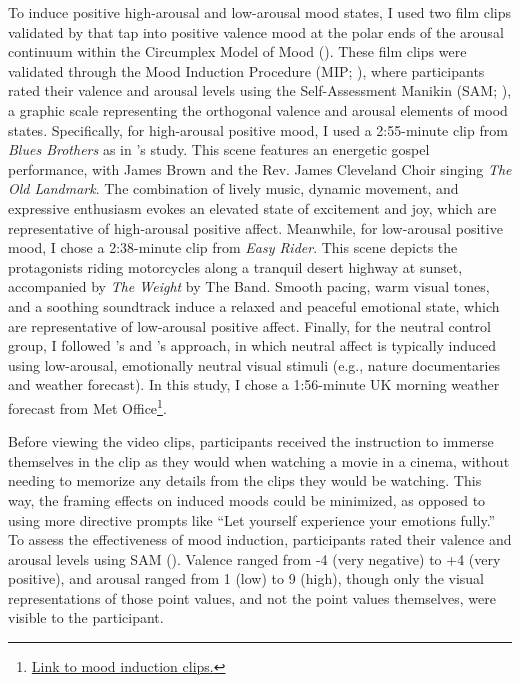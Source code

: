 \documentclass[../MA_Thesis.tex]{subfiles}
\begin{document}
To induce positive high-arousal and low-arousal mood states, I used two film clips validated by \textcite{wensveen_push_2002} that tap into positive valence mood at the polar ends of the arousal continuum within the Circumplex Model of Mood (\cite{feldman_variations_1995}). These film clips were validated through the Mood Induction Procedure (MIP; \cite{lench_discrete_2011}), where participants rated their valence and arousal levels using the Self-Assessment Manikin (SAM; \cite{bradley_affect_1999}), a graphic scale representing the orthogonal valence and arousal elements of mood states. Specifically, for high-arousal positive mood, I used a 2:55-minute clip from \textit{Blues Brothers} as in \cite{wensveen_push_2002}'s study. This scene features an energetic gospel performance, with James Brown and the Rev. James Cleveland Choir singing \textit{The Old Landmark}. The combination of lively music, dynamic movement, and expressive enthusiasm evokes an elevated state of excitement and joy, which are representative of high-arousal positive affect. Meanwhile, for low-arousal positive mood, I chose a 2:38-minute clip from \textit{Easy Rider}. This scene depicts the protagonists riding motorcycles along a tranquil desert highway at sunset, accompanied by \textit{The Weight} by The Band. Smooth pacing, warm visual tones, and a soothing soundtrack induce a relaxed and peaceful emotional state, which are representative of low-arousal positive affect. Finally, for the neutral control group, I followed \textcite{maryam_fakhrhosseini_affectemotion_2017}'s and \textcite{siedlecka_experimental_2019}'s approach, in which neutral affect is typically induced using low-arousal, emotionally neutral visual stimuli (e.g., nature documentaries and weather forecast). In this study, I chose a 1:56-minute UK morning weather forecast from Met Office\footnote{\href{https://drive.google.com/drive/u/0/folders/1TgkST_8BaKBVv45mN1DDP4-GMQafI4mG?ths=true}{Link to mood induction clips.}}.

Before viewing the video clips, participants received the instruction to immerse themselves in the clip as they would when watching a movie in a cinema, without needing to memorize any details from the clips they would be watching. This way, the framing effects on induced moods could be minimized, as opposed to using more directive prompts like ``Let yourself experience your emotions fully.'' To assess the effectiveness of mood induction, participants rated their valence and arousal levels using SAM (\cite{bradley_affect_1999}). Valence ranged from -4 (very negative) to +4 (very positive), and arousal ranged from 1 (low) to 9 (high), though only the visual representations of those point values, and not the point values themselves, were visible to the participant. 
\end{document}
